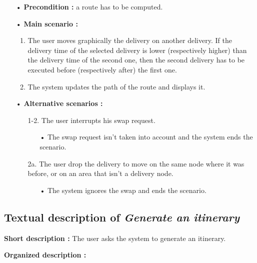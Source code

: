 \documentclass[paper=a4,fontsize=11pt]{report}
\numberwithin{equation}{section}		%
\numberwithin{figure}{section}		%
\numberwithin{table}{section}		%
\renewcommand{\it}[1]{\textit{#1}}
\begin{document}
\begin{itemize}
  \item[•] \textbf{Precondition :} a route has to be computed.
  \item[•] \textbf{Main scenario :}
  \begin{enumerate}
    \item The user moves graphically the delivery on another delivery. If the delivery time of the selected delivery is lower (respectively higher) than the delivery time of the second one, then the second delivery has to be executed before (respectively after) the first one.
    \item The system updates the path of the route and displays it.
  \end{enumerate}
  \item[•] \textbf{Alternative scenarios :}
  \begin{itemize}
    \item[1-2.] The user interrupts his swap request.
    \begin{itemize}
      \item[•] The swap request isn’t taken into account and the system ends the scenario.
    \end{itemize}
    \item[2a.]  The user drop the delivery to move on the same node where it was before, or on an area that isn’t a delivery node.
    \begin{itemize}
      \item[•] The system ignores the swap and ends the scenario.
    \end{itemize}
  \end{itemize}
\end{itemize}

\subsection{Textual description of \it{Generate an itinerary}}
\label{subsec:textual-description-of-generate-an-itinerary}

\textbf{Short description :} The user asks the system to generate an itinerary.

\textbf{Organized description :}
\end{document}
